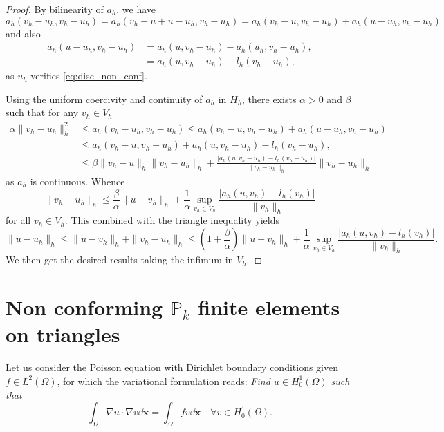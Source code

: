\begin{proof}
By bilinearity of $a_h$, we have
$$a_h(v_h-u_h,v_h-u_h)=a_h(v_h-u+u-u_h,v_h-u_h)=a_h(v_h-u,v_h-u_h) + a_h(u-u_h,v_h-u_h)$$
and also
\begin{align*}
a_h(u-u_h,v_h-u_h) &=  a_h(u,v_h-u_h)- a_h(u_h,v_h-u_h), \\
&=   a_h(u,v_h-u_h)  - l_h(v_h-u_h),
\end{align*}
as $u_h$ verifies \eqref{eq:disc_non_conf}.

Using the uniform coercivity and continuity of $a_h$ in $H_h$,
there exists  $\alpha>0$ and $\beta$ such that for any $v_h\in V_h$
\begin{align*}
  \alpha \|v_h-u_h\|_h^2 &\leq a_h(v_h-u_h,v_h-u_h) 
 \leq  a_h(v_h-u,v_h-u_h) + a_h(u-u_h,v_h-u_h)
  \\
  &\leq a_h(v_h-u,v_h-u_h) +  a_h(u,v_h-u_h) -  l_h(v_h-u_h),\\
  &\leq \beta\|v_h-u\|_h\|v_h-u_h\|_h +  \frac{|a_h(u,v_h-u_h)-l_h(v_h-u_h)|}{\|v_h-u_h\|_h}
  \|v_h-u_h\|_h
\end{align*}
as $a_h$ is continuous.
Whence 
$$\|v_h-u_h\|_h\leq \frac \beta\alpha \|u-v_h\|_h
+\frac{1}{\alpha}\sup_{v_h\in V_h}  \frac{|a_h(u,v_h)-l_h(v_h)|}{\|v_h\|_h}
$$ for all
$v_h\in V_h$. This combined with  the triangle inequality yields
$$\|u-u_h\|_h\leq \|u-v_h\|_h + \|v_h-u_h\|_h \leq
\left(1+\frac{\beta}{\alpha} \right)\|u-v_h\|_h
+\frac{1}{\alpha}\sup_{v_h\in V_h}  \frac{|a_h(u,v_h)-l_h(v_h)|}{\|v_h\|_h}.
$$
We then get the desired results taking the infimum in $V_h$.
\end{proof}

\section{Non conforming $ \mathbb{P}_k$ finite elements on triangles}

Let us consider the Poisson equation with Dirichlet boundary conditions given $f\in L^2(\Omega)$, for which the variational formulation reads: \emph{ Find $u\in H^1_0(\Omega)$ such that}
\begin{equation}\label{eq:poisson_nonconf}
\int_\Omega \nabla u\cdot \nabla v \dd \mathbf{x} = \int_\Omega f v \dd \mathbf{x}\quad\forall v\in H^1_0(\Omega).
\end{equation}

